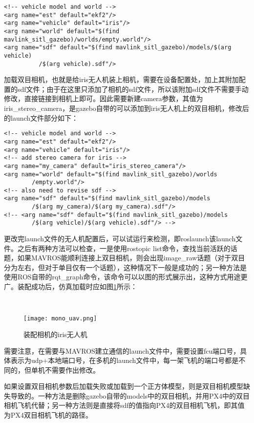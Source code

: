 \begin{verbatim}
<!-- vehicle model and world -->
<arg name="est" default="ekf2"/>
<arg name="vehicle" default="iris"/>
<arg name="world" default="$(find mavlink_sitl_gazebo)/worlds/empty.world"/>
<arg name="sdf" default="$(find mavlink_sitl_gazebo)/models/$(arg vehicle)
          /$(arg vehicle).sdf"/>
\end{verbatim}

加载双目相机，也就是给iris无人机装上相机，需要在设备配置处，加上其附加配置的sdf文件；由于在这里只添加了相机的sdf文件，所以该附加sdf文件不需要手动修改，直接链接到相机上即可。因此需要新建camera参数，其值为iris\_stereo\_camera，是gazebo自带的可以添加到iris无人机上的双目相机，修改后的launch文件部分如下：

\begin{verbatim}
<!-- vehicle model and world -->
<arg name="est" default="ekf2"/>
<arg name="vehicle" default="iris"/>
<!-- add stereo camera for iris -->
<arg name="my_camera" default="iris_stereo_camera"/>
<arg name="world" default="$(find mavlink_sitl_gazebo)/worlds
        /empty.world"/>
<!-- also need to revise sdf -->
<arg name="sdf" default="$(find mavlink_sitl_gazebo)/models
        /$(arg my_camera)/$(arg my_camera).sdf"/>
<!-- <arg name="sdf" default="$(find mavlink_sitl_gazebo)/models
        /$(arg vehicle)/$(arg vehicle).sdf"/> -->
\end{verbatim}

更改完launch文件的无人机配置后，可以试运行来检测，即roslaunch该launch文件。之后有两种方法可以检查，一是使用rostopic list命令，查找当前活跃的话题，如果MAVROS能顺利连接上双目相机，则会出现image\_raw话题（对于双目分为左右，但对于单目仅有一个话题），这种情况下一般是成功的；另一种方法是使用ROS自带的rqt\_graph命令，该命令可以以图的形式展示出，这种方式用途更广。装配成功后，仿真加载时应如图\ref{fig4-2}所示：

~\\
\begin{figure}[!ht]
	\centering
	\texttt{[image: mono\_uav.png]}
	\caption{装配相机的iris无人机}
	\label{fig4-2}
\end{figure}

需要注意，在需要与MAVROS建立通信的launch文件中，需要设置fcu端口号，具体表示为udp+本地端口号，在多机的launch文件中，每一架飞机的端口号都是不同的，但单机不需要作出修改。

如果设置双目相机参数后加载失败或加载到一个正方体模型，则是双目相机模型缺失导致的。一种方法是删除gazebo自带的models中的双目相机，并用PX4中的双目相机飞机代替；另一种方法则是直接将sdf的值指向PX4的双目相机飞机，即其值为PX4双目相机飞机的路径。


